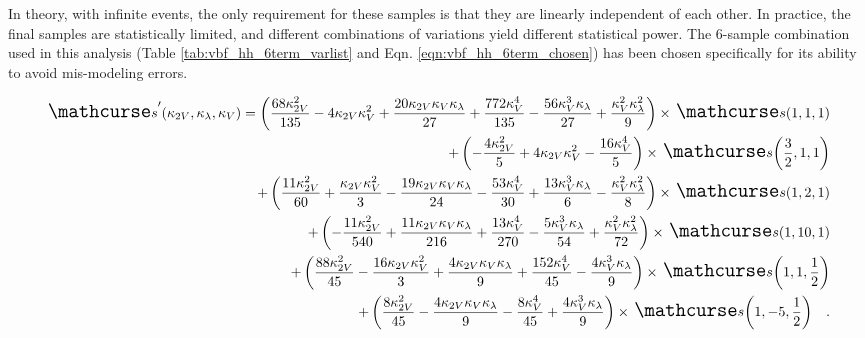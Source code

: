     In theory, with infinite events, the only requirement for these samples is that they are linearly independent of each other.
    In practice, the final samples are statistically limited, and different combinations of variations yield different statistical power.
    The 6-sample combination used in this analysis (Table \ref{tab:vbf_hh_6term_varlist} and Eqn. \ref{eqn:vbf_hh_6term_chosen}) has been chosen specifically for its ability to avoid mis-modeling errors.

    {\footnotesize \begin{equation}
    \label{eqn:vbf_hh_6term_chosen}
    \begin{split}
        \xsec'(\kvv, \kl, \kv) =
            \left(\frac{68 \kappa_{2V}^{2}}{135} - 4 \kappa_{2V} \kappa_{V}^{2} + \frac{20 \kappa_{2V} \kappa_{V} \kappa_{\lambda}}{27} + \frac{772 \kappa_{V}^{4}}{135} - \frac{56 \kappa_{V}^{3} \kappa_{\lambda}}{27} + \frac{\kappa_{V}^{2} \kappa_{\lambda}^{2}}{9}\right) \times \xsec{\left(1,1,1 \right)} \\
            + \left(- \frac{4 \kappa_{2V}^{2}}{5} + 4 \kappa_{2V} \kappa_{V}^{2} - \frac{16 \kappa_{V}^{4}}{5}\right) \times \xsec{\left(\frac{3}{2},1,1 \right)} \\
            + \left(\frac{11 \kappa_{2V}^{2}}{60} + \frac{\kappa_{2V} \kappa_{V}^{2}}{3} - \frac{19 \kappa_{2V} \kappa_{V} \kappa_{\lambda}}{24} - \frac{53 \kappa_{V}^{4}}{30} + \frac{13 \kappa_{V}^{3} \kappa_{\lambda}}{6} - \frac{\kappa_{V}^{2} \kappa_{\lambda}^{2}}{8}\right) \times \xsec{\left(1,2,1 \right)} \\
            + \left(- \frac{11 \kappa_{2V}^{2}}{540} + \frac{11 \kappa_{2V} \kappa_{V} \kappa_{\lambda}}{216} + \frac{13 \kappa_{V}^{4}}{270} - \frac{5 \kappa_{V}^{3} \kappa_{\lambda}}{54} + \frac{\kappa_{V}^{2} \kappa_{\lambda}^{2}}{72}\right) \times \xsec{\left(1,10,1 \right)}  \\
            + \left(\frac{88 \kappa_{2V}^{2}}{45} - \frac{16 \kappa_{2V} \kappa_{V}^{2}}{3} + \frac{4 \kappa_{2V} \kappa_{V} \kappa_{\lambda}}{9} + \frac{152 \kappa_{V}^{4}}{45} - \frac{4 \kappa_{V}^{3} \kappa_{\lambda}}{9}\right) \times \xsec{\left(1,1,\frac{1}{2} \right)} \\
            + \left(\frac{8 \kappa_{2V}^{2}}{45} - \frac{4 \kappa_{2V} \kappa_{V} \kappa_{\lambda}}{9} - \frac{8 \kappa_{V}^{4}}{45} + \frac{4 \kappa_{V}^{3} \kappa_{\lambda}}{9}\right) \times \xsec{\left(1,-5,\frac{1}{2} \right)}
        \quad.
    \end{split} \end{equation}}

